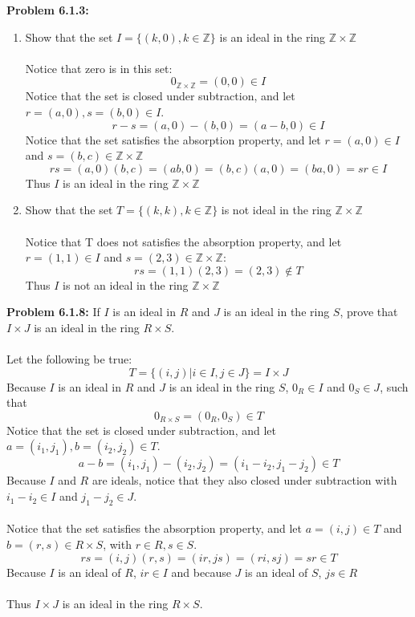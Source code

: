 \documentclass[12pt]{article}
\begin{document}
\newpage

\noindent \textbf{Problem 6.1.3: }
	\begin{enumerate}[label = (\alph*)]
		\item Show that the set $I = \{(k, 0), k \in \mathbb{Z}\}$ is an ideal in the ring $\mathbb{Z} \times \mathbb{Z}$
		\\ \\
		Notice that zero is in this set:
			$$
			0_{\mathbb{Z} \times \mathbb{Z}} = (0,0) \in I
			$$
		Notice that the set is closed under subtraction, and let $r = (a, 0), s = (b,0) \in I$.
			$$
			r - s = (a,0) - (b,0) = (a-b,0) \in I
			$$
		Notice that the set satisfies the absorption property, and let $r = (a, 0) \in I$ and $s = (b,c) \in \mathbb{Z} \times \mathbb{Z}$
			$$
			rs = (a,0)(b,c) = (ab, 0) = (b,c)(a,0) = (ba, 0) = sr \in I
			$$
		Thus $I$ is an ideal in the ring $\mathbb{Z} \times \mathbb{Z}$
		\\ 
		\item Show that the set $T = \{(k, k), k \in \mathbb{Z}\}$ is not ideal in the ring $\mathbb{Z} \times \mathbb{Z}$
		\\ \\
		Notice that T does not satisfies the absorption property, and let $r = (1,1) \in I$ and $s = (2,3) \in \mathbb{Z} \times \mathbb{Z}$:
			$$
			rs = (1,1)(2,3) = (2 , 3) \not \in T
			$$
		Thus $I$ is not an ideal in the ring $\mathbb{Z} \times \mathbb{Z}$
	\end{enumerate}	

\newpage

\noindent \textbf{Problem 6.1.8: }If $I$ is an ideal in $R$ and $J$ is an ideal in the ring $S$, prove that $I \times J$ is an ideal in the ring $R \times S$.
	\\ \\
	Let the following be true:
		$$
		T = \{(i,j) | i \in I, j \in J\} = I \times J
		$$
	Because $I$ is an ideal in $R$ and $J$ is an ideal in the ring $S$, $0_R \in I$ and $0_S \in J$, such that 
		$$
		0_{R \times S} = (0_R, 0_S) \in T
		$$
	Notice that the set is closed under subtraction, and let $a = (i_1, j_1), b = (i_2,j_2) \in T$.  
		$$
		a - b = (i_1, j_1) - (i_2,j_2) = (i_1 - i_2,j_1 - j_2) \in T
		$$
	Because $I$ and $R$ are ideals, notice that they also closed under subtraction with $i_1 - i_2 \in I$ and $j_1 - j_2 \in J$. \\\\
	Notice that the set satisfies the absorption property, and let $a = (i,j) \in T$ and $b = (r,s) \in R \times S$, with $r \in R, s \in S$.
		$$
		rs = (i,j)(r,s) = (ir, js) = (ri,sj) = sr \in T
		$$
	Because $I$ is an ideal of $R$, $ir \in I$ and because $J$ is an ideal of $S$, $js \in R$
	\\ \\
	Thus $I \times J$ is an ideal in the ring $R \times S$.
\end{document}
